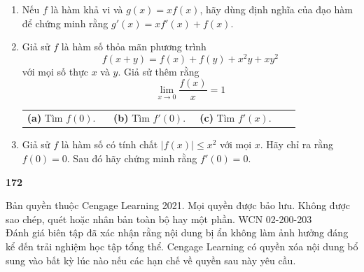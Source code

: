 \begin{minipage}[t]{0.73\textwidth}
\begin{enumerate}[label=\textbf{\arabic*.}, leftmargin=1.4em, itemsep=7pt, topsep=0pt, parsep=0pt]
    \item Nếu $f$ là hàm khả vi và $g(x) = x f(x)$, hãy dùng định nghĩa của đạo hàm để chứng minh rằng $g'(x) = x f'(x) + f(x)$.

    \item Giả sử $f$ là hàm số thỏa mãn phương trình
    \[
      f(x + y) = f(x) + f(y) + x^2 y + x y^2
    \]
    với mọi số thực $x$ và $y$. Giả sử thêm rằng
    \[
      \lim_{x \to 0} \frac{f(x)}{x} = 1
    \]
    \vspace{-2pt}
    \noindent
    \begin{tabular}{@{}p{0.3\linewidth}p{0.3\linewidth}p{0.35\linewidth}@{}}
      \textbf{(a)} Tìm $f(0)$. & \textbf{(b)} Tìm $f'(0)$. & \textbf{(c)} Tìm $f'(x)$.
    \end{tabular}

    \item Giả sử $f$ là hàm số có tính chất $|f(x)| \leqslant x^2$ với mọi $x$. Hãy chỉ ra rằng $f(0) = 0$. Sau đó hãy chứng minh rằng $f'(0) = 0$.
  \end{enumerate}
\end{minipage}

\vfill
\noindent
\begin{minipage}[b]{0.20\textwidth}
  {\fontsize{12pt}{14pt}\selectfont\textbf{\textsf{172}}}
\end{minipage}%
\hfill
\begin{minipage}[b]{0.77\textwidth}
  \fontsize{5.5pt}{6.8pt}\selectfont\color{copyrightgray}%
  Bản quyền thuộc Cengage Learning 2021. Mọi quyền được bảo lưu. Không được sao chép, quét hoặc nhân bản toàn bộ hay một phần. WCN 02-200-203\\
  Đánh giá biên tập đã xác nhận rằng nội dung bị ẩn không làm ảnh hưởng đáng kể đến trải nghiệm học tập tổng thể. Cengage Learning có quyền xóa nội dung bổ sung vào bất kỳ lúc nào nếu các hạn chế về quyền sau này yêu cầu.%
\end{minipage}
